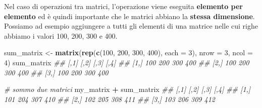 \documentclass[
]{book}
\newenvironment{Shaded}{\begin{snugshade}}{\end{snugshade}}
\newcommand{\CommentTok}[1]{\textcolor[rgb]{0.56,0.35,0.01}{\textit{#1}}}
\newcommand{\DataTypeTok}[1]{\textcolor[rgb]{0.13,0.29,0.53}{#1}}
\newcommand{\DecValTok}[1]{\textcolor[rgb]{0.00,0.00,0.81}{#1}}
\newcommand{\KeywordTok}[1]{\textcolor[rgb]{0.13,0.29,0.53}{\textbf{#1}}}
\newcommand{\NormalTok}[1]{#1}
\newcommand{\OperatorTok}[1]{\textcolor[rgb]{0.81,0.36,0.00}{\textbf{#1}}}
\newcommand{\StringTok}[1]{\textcolor[rgb]{0.31,0.60,0.02}{#1}}
\begin{document}
Nel caso di operazioni tra matrici, l'operazione viene eseguita \textbf{elemento per elemento} ed è quindi importante che le matrici abbiano la \textbf{stessa dimensione}. Possiamo ad esempio aggiungere a tutti gli elementi di una matrice nelle cui righe abbiamo i valori 100, 200, 300 e 400.

\begin{Shaded}
\begin{Highlighting}[]
\NormalTok{sum_matrix <-}\StringTok{ }\KeywordTok{matrix}\NormalTok{(}\KeywordTok{rep}\NormalTok{(}\KeywordTok{c}\NormalTok{(}\DecValTok{100}\NormalTok{, }\DecValTok{200}\NormalTok{, }\DecValTok{300}\NormalTok{, }\DecValTok{400}\NormalTok{), }\DataTypeTok{each =} \DecValTok{3}\NormalTok{), }\DataTypeTok{nrow =} \DecValTok{3}\NormalTok{, }\DataTypeTok{ncol =} \DecValTok{4}\NormalTok{)}
\NormalTok{sum_matrix}
\CommentTok{##      [,1] [,2] [,3] [,4]}
\CommentTok{## [1,]  100  200  300  400}
\CommentTok{## [2,]  100  200  300  400}
\CommentTok{## [3,]  100  200  300  400}

\CommentTok{# sommo due matrici}
\NormalTok{my_matrix }\OperatorTok{+}\StringTok{ }\NormalTok{sum_matrix}
\CommentTok{##      [,1] [,2] [,3] [,4]}
\CommentTok{## [1,]  101  204  307  410}
\CommentTok{## [2,]  102  205  308  411}
\CommentTok{## [3,]  103  206  309  412}
\end{Highlighting}
\end{Shaded}
\end{document}
